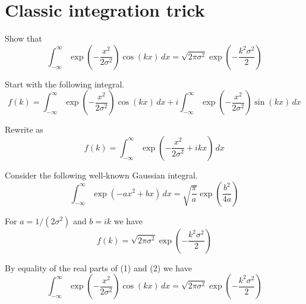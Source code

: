 

\section*{Classic integration trick}

Show that
\begin{equation*}
\int_{-\infty}^\infty
\exp\left(-\frac{x^2}{2\sigma^2}\right)\cos(kx)\,dx
=\sqrt{2\pi\sigma^2}\exp\left(-\frac{k^2\sigma^2}{2}\right)
\end{equation*}

Start with the following integral.
\begin{equation*}
f(k)=\int_{-\infty}^\infty\exp\left(-\frac{x^2}{2\sigma^2}\right)\cos(kx)\,dx
+i\int_{-\infty}^\infty\exp\left(-\frac{x^2}{2\sigma^2}\right)\sin(kx)\,dx
\tag{1}
\end{equation*}

Rewrite as
\begin{equation*}
f(k)=\int_{-\infty}^\infty\exp\left(-\frac{x^2}{2\sigma^2}+ikx\right)\,dx
\end{equation*}

Consider the following well-known Gaussian integral.
\begin{equation*}
\int_{-\infty}^\infty\exp(-ax^2+bx)\,dx=\sqrt{\frac{\pi}{a}}\exp\left(\frac{b^2}{4a}\right)
\end{equation*}

For $a=1/(2\sigma^2)$ and $b=ik$ we have
\begin{equation*}
f(k)=\sqrt{2\pi\sigma^2}\exp\left(-\frac{k^2\sigma^2}{2}\right)
\tag{2}
\end{equation*}

By equality of the real parts of (1) and (2) we have
\begin{equation*}
\int_{-\infty}^\infty\exp\left(-\frac{x^2}{2\sigma^2}\right)\cos(kx)\,dx
=\sqrt{2\pi\sigma^2}\exp\left(-\frac{k^2\sigma^2}{2}\right)
\end{equation*}


